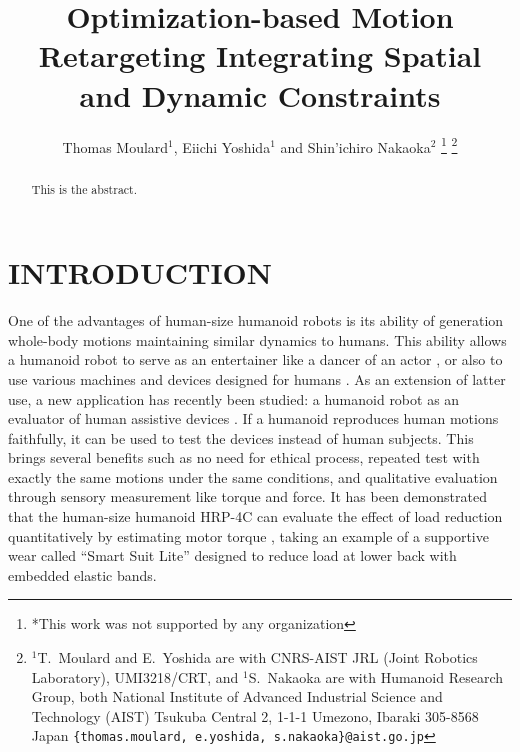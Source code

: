 \documentclass[letterpaper, 10 pt, conference]{ieeeconf}  %
\title{\LARGE \bf
Optimization-based Motion Retargeting Integrating Spatial and Dynamic Constraints
}
\author{Thomas Moulard$^{1}$, Eiichi Yoshida$^{1}$ and Shin'ichiro
  Nakaoka$^{2}$%
\thanks{*This work was not supported by any organization}%
\thanks{$^{1}$T.~Moulard and E.~Yoshida are with CNRS-AIST JRL (Joint
  Robotics Laboratory), UMI3218/CRT, and $^{1}$S.~Nakaoka are with
  Humanoid Research Group, both National Institute of Advanced Industrial Science and Technology (AIST)
Tsukuba Central 2, 1-1-1 Umezono, Ibaraki 305-8568 Japan
        {\tt\footnotesize \{thomas.moulard, e.yoshida, s.nakaoka\}@aist.go.jp}}%
}
\begin{document}
\maketitle
\thispagestyle{empty}
\pagestyle{empty}


\begin{abstract}
This is the abstract.

\end{abstract}


\section{INTRODUCTION}
\label{sec:intro}

One of the advantages of human-size humanoid robots is
its ability of generation whole-body motions maintaining similar
dynamics to humans. 
This ability allows a humanoid robot to serve as an entertainer like
a dancer of an actor \cite{nakaoka_iros2010}, or also to use various
machines and devices designed for humans \cite{Yokoi03iros}.
As an extension of latter use, a new application
has recently been studied: a humanoid robot as an evaluator of human
assistive devices \cite{Takanishi06ICRA,Miura13ICRA}.
If a humanoid reproduces human motions faithfully, it can be used to
test the devices instead of human subjects. 
This brings several benefits such as no need for ethical 
process, repeated test with exactly the same motions under the same
conditions, and qualitative evaluation through sensory measurement
like torque and force.
It has been demonstrated that the human-size humanoid HRP-4C
\cite{Kaneko09Humanoids}  can evaluate the effect of load reduction
quantitatively by estimating motor torque \cite{Miura13ICRA}, taking
an example of a supportive wear called ``Smart Suit Lite''
\cite{Tanaka11JRM} designed to reduce load 
at lower back with embedded elastic bands. 
\end{document}
